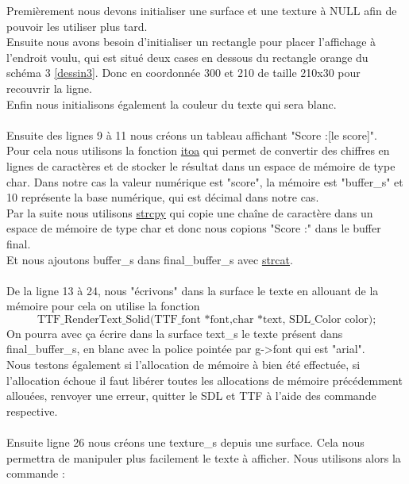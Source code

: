 \documentclass[a4paper,10p]{report}
\begin{document}
Premièrement nous devons initialiser une surface et une texture à NULL afin de pouvoir les utiliser plus tard.
\\Ensuite nous avons besoin d'initialiser un rectangle pour placer l'affichage à l'endroit voulu, qui est situé deux cases en dessous du rectangle orange du schéma 3 \ref{dessin3}. Donc en coordonnée 300 et 210 de taille 210x30 pour recouvrir la ligne.
\\Enfin nous initialisons également la couleur du texte qui sera blanc.
\\\\
Ensuite des lignes \textcolor{gris}{9} à \textcolor{gris}{11} nous créons un tableau affichant "Score :[le score]".
\\Pour cela nous utilisons la fonction \href{https://www.ibm.com/docs/fr/i/7.5?topic=functions-itoa-convert-integer-string}{itoa} qui permet de convertir des chiffres en lignes de caractères et de stocker le résultat dans un espace de mémoire de type char. Dans notre cas la valeur numérique est "score", la mémoire est "buffer\_s" et 10 représente la base numérique, qui est décimal dans notre cas.
\\Par la suite nous utilisons \href{https://www.ibm.com/docs/fr/i/7.5?topic=functions-strcpy-copy-strings}{strcpy} qui copie une chaîne de caractère dans un espace de mémoire de type char et donc nous copions "Score :" dans le buffer final.
\\Et nous ajoutons buffer\_s dans final\_buffer\_s avec \href{https://www.ibm.com/docs/fr/i/7.5?topic=functions-strcat-concatenate-strings}{strcat}.
\\\\
De la ligne \textcolor{gris}{13} à \textcolor{gris}{24}, nous "écrivons" dans la surface le texte en allouant de la mémoire pour cela on utilise la fonction 
\begin{equation*}
\text{TTF\_RenderText\_Solid(TTF\_font\  *font,char\  *text, SDL\_Color color);}
\end{equation*}
On pourra avec ça écrire dans la surface text\_s le texte présent dans final\_buffer\_s, en blanc avec la police pointée par g->font qui est "arial".
\\Nous testons également si l'allocation de mémoire à bien été effectuée, si l'allocation échoue il faut libérer toutes les allocations de mémoire précédemment allouées, renvoyer une erreur, quitter le SDL et TTF à l'aide des commande respective.
\\\\Ensuite ligne \textcolor{gris}{26} nous créons une texture\_s depuis une surface. Cela nous permettra de manipuler plus facilement le texte à afficher. Nous utilisons alors la commande :
\end{document}
